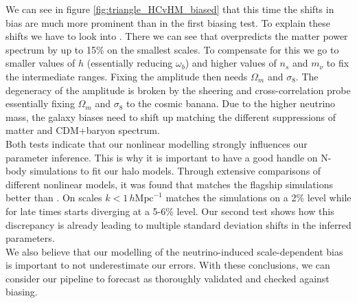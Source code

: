 \documentclass[../main.tex]{subfiles}
\begin{document}
We can see in figure \ref{fig:triangle_HCvHM_biased} that this time the shifts in bias are much more prominent than in the first biasing test. To explain these shifts we have to look into \cite{Mead:2020vgs}. There we can see that \halofit overpredicts the matter power spectrum by up to 15\% on the smallest scales. To compensate for this we go to smaller values of $h$ (essentially reducing $\omega_b$) and higher values of $n_s$ and $m_\nu$ to fix the intermediate ranges. Fixing the amplitude then needs $\Omega_m$ and $\sigma_8$. The degeneracy of the amplitude is broken by the sheering and cross-correlation probe essentially fixing $\Omega_m$ and $\sigma_8$ to the cosmic banana. Due to the higher neutrino mass, the galaxy biases need to shift up matching the different suppressions of matter and CDM+baryon spectrum.\\
Both tests indicate that our nonlinear modelling strongly influences our parameter inference. This is why it is important to have a good handle on N-body simulations to fit our halo models. Through extensive comparisons of different nonlinear models, it was found that \hmcode matches the \Euclid flagship simulations better than \halofit. On scales $k<1 \,h \mathrm{Mpc}^{-1}$ \hmcode matches the simulations on a 2\% level while \halofit for late times starts diverging at a 5-6\% level. Our second test shows how this discrepancy is already leading to multiple standard deviation shifts in the inferred parameters.\\
We also believe that our modelling of the neutrino-induced scale-dependent bias is important to not underestimate our errors. With these conclusions, we can consider our pipeline to forecast as thoroughly validated and checked against biasing. 
\end{document}
